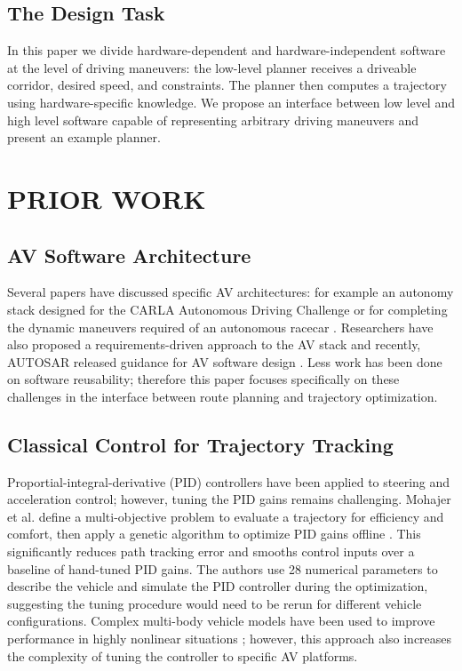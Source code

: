 \documentclass[letterpaper, 10 pt, conference]{ieeeconf}  %
\begin{document}
\subsection{The Design Task}
In this paper we divide hardware-dependent and hardware-independent software at the level of driving maneuvers: the low-level planner receives a driveable corridor, desired speed, and constraints. The planner then computes a trajectory using hardware-specific knowledge. We propose an interface between low level and high level software capable of representing arbitrary driving maneuvers and present an example planner.

\section{PRIOR WORK}
\subsection{AV Software Architecture}
Several papers have discussed specific AV architectures: for example an autonomy stack designed for the CARLA Autonomous Driving Challenge \cite{carla_software_architecture} or for completing the dynamic maneuvers required of an autonomous racecar \cite{betz2019software}. Researchers have also proposed a requirements-driven approach to the AV stack \cite{standards_driven_software} and recently, AUTOSAR released guidance for AV software design \cite{autosar}. Less work has been done on software reusability; therefore this paper focuses specifically on these challenges in the interface between route planning and trajectory optimization.

\subsection{Classical Control for Trajectory Tracking}
Proportial-integral-derivative (PID) controllers have been applied to steering and acceleration control; however, tuning the PID gains remains challenging. Mohajer et al. define a multi-objective problem to evaluate a trajectory for efficiency and comfort, then apply a genetic algorithm to optimize PID gains offline \cite{pid}. This significantly reduces path tracking error and smooths control inputs over a baseline of hand-tuned PID gains. The authors use 28 numerical parameters to describe the vehicle and simulate the PID controller during the optimization, suggesting the tuning procedure would need to be rerun for different vehicle configurations.
Complex multi-body vehicle models have been used to improve performance in highly nonlinear situations \cite{CHEBLY201712526}; however, this approach also increases the complexity of tuning the controller to specific AV platforms.
\end{document}
